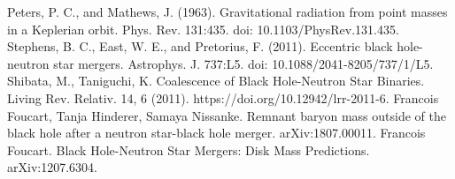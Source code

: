 \documentclass[binding=0.6cm, LaM]{sapthesis}
\begin{document}
\begin{thebibliography}{500}
	 Peters, P. C., and Mathews, J. (1963). Gravitational radiation from point masses in a Keplerian orbit. Phys. Rev. 131:435. doi: 10.1103/PhysRev.131.435.
	 Stephens, B. C., East, W. E., and Pretorius, F. (2011). Eccentric black hole-neutron star mergers. Astrophys. J. 737:L5. doi: 10.1088/2041-8205/737/1/L5.
	 Shibata, M., Taniguchi, K. Coalescence of Black Hole-Neutron Star Binaries. Living Rev. Relativ. 14, 6 (2011). https://doi.org/10.12942/lrr-2011-6.
	 Francois Foucart, Tanja Hinderer, Samaya Nissanke. Remnant baryon mass outside of the black hole after a neutron star-black hole merger. arXiv:1807.00011.
	 Francois Foucart. Black Hole-Neutron Star Mergers: Disk Mass Predictions. arXiv:1207.6304.

\end{thebibliography}

\printbibliography
\end{document}
